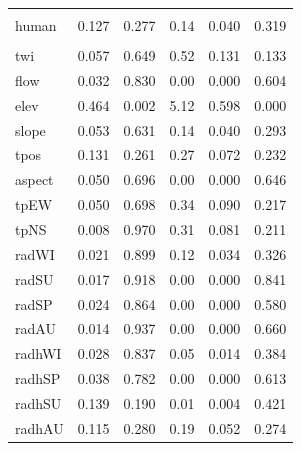 \begin{table}[]
\begin{tabular}{lrrrrr}
\addlinespace[0.3em]
\multicolumn{6}{l}{\textbf{Landscape}}\\
\hspace{1em}human & 0.127 & 0.277 & 0.14 & 0.040 & 0.319\\
\addlinespace[0.3em]
\multicolumn{6}{l}{\textbf{Topography}}\\
\hspace{1em}twi & 0.057 & 0.649 & 0.52 & 0.131 & 0.133\\
\hspace{1em}flow & 0.032 & 0.830 & 0.00 & 0.000 & 0.604\\
\hspace{1em}elev & 0.464 & 0.002 & 5.12 & 0.598 & 0.000\\
\hspace{1em}slope & 0.053 & 0.631 & 0.14 & 0.040 & 0.293\\
\hspace{1em}tpos & 0.131 & 0.261 & 0.27 & 0.072 & 0.232\\
\hspace{1em}aspect & 0.050 & 0.696 & 0.00 & 0.000 & 0.646\\
\hspace{1em}tpEW & 0.050 & 0.698 & 0.34 & 0.090 & 0.217\\
\hspace{1em}tpNS & 0.008 & 0.970 & 0.31 & 0.081 & 0.211\\
\hspace{1em}radWI & 0.021 & 0.899 & 0.12 & 0.034 & 0.326\\
\hspace{1em}radSU & 0.017 & 0.918 & 0.00 & 0.000 & 0.841\\
\hspace{1em}radSP & 0.024 & 0.864 & 0.00 & 0.000 & 0.580\\
\hspace{1em}radAU & 0.014 & 0.937 & 0.00 & 0.000 & 0.660\\
\hspace{1em}radhWI & 0.028 & 0.837 & 0.05 & 0.014 & 0.384\\
\hspace{1em}radhSP & 0.038 & 0.782 & 0.00 & 0.000 & 0.613\\
\hspace{1em}radhSU & 0.139 & 0.190 & 0.01 & 0.004 & 0.421\\
\hspace{1em}radhAU & 0.115 & 0.280 & 0.19 & 0.052 & 0.274\\
\bottomrule
\end{tabular}
\endgroup{}
\end{table}



